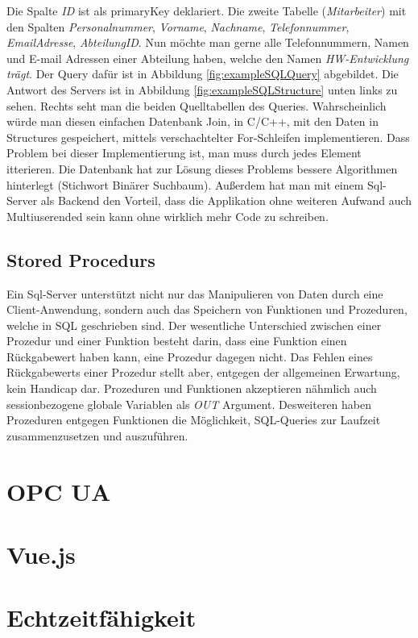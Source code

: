 Die Spalte \emph{ID} ist als primaryKey deklariert.
Die zweite Tabelle (\emph{Mitarbeiter}) mit den Spalten \emph{Personalnummer}, \emph{Vorname}, \emph{Nachname}, \emph{Telefonnummer}, \emph{EmailAdresse}, \emph{AbteilungID}.
Nun möchte man gerne alle Telefonnummern, Namen und E-mail Adressen einer Abteilung haben, welche den Namen \emph{HW-Entwicklung trägt}.
Der Query dafür ist in Abbildung \ref{fig:exampleSQLQuery} abgebildet.
Die Antwort des Servers ist in Abbildung \ref{fig:exampleSQLStructure} unten links zu sehen.
Rechts seht  man die beiden Quelltabellen des Queries.
Wahrscheinlich würde man diesen einfachen Datenbank Join, in C/C++, mit den Daten in Structures gespeichert, mittels verschachtelter For-Schleifen implementieren. Dass Problem bei dieser Implementierung ist, man muss durch jedes Element itterieren.
Die Datenbank hat zur Lösung dieses Problems bessere Algorithmen hinterlegt (Stichwort Binärer Suchbaum).
Außerdem hat man mit einem Sql-Server als Backend den Vorteil, dass die Applikation ohne weiteren Aufwand auch Multiuserended sein kann ohne wirklich mehr Code zu schreiben.
\subsection{Stored Procedurs}\label{subsec:storedProc}
Ein Sql-Server unterstützt nicht nur das Manipulieren von Daten durch eine Client-Anwendung, sondern auch das Speichern von Funktionen und Prozeduren, welche in SQL geschrieben sind.
Der wesentliche Unterschied zwischen einer Prozedur und einer Funktion besteht darin, dass eine Funktion einen Rückgabewert haben kann, eine Prozedur dagegen nicht.
Das Fehlen eines Rückgabewerts einer Prozedur stellt aber, entgegen der allgemeinen Erwartung, kein Handicap dar. Prozeduren und Funktionen akzeptieren nähmlich auch sessionbezogene globale Variablen als \emph{OUT} Argument. 
Desweiteren haben Prozeduren entgegen Funktionen die Möglichkeit, SQL-Queries zur Laufzeit zusammenzusetzen und auszuführen.

\section{OPC UA}
\section{Vue.js}
\section{Echtzeitfähigkeit}
